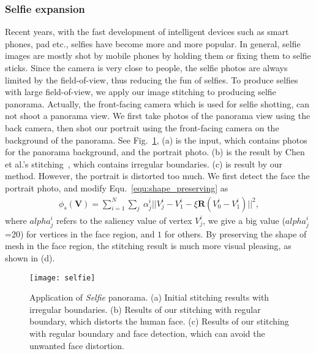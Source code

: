 \documentclass[10pt,journal,compsoc]{IEEEtran}
\begin{document}
 \subsubsection{Selfie expansion}

Recent years, with the fast development of intelligent devices such as smart phones, pad etc., selfies have become more and more popular.
In general, selfie images are mostly shot by mobile phones by holding them or fixing them to selfie sticks.
Since the camera is very close to people, the selfie photos are always limited by the field-of-view, thus reducing the fun of selfies.
To produce selfies with large field-of-view, we apply our image stitching to producing selfie panorama.
Actually, the front-facing camera which is used for selfie shotting, can not shoot a panorama view.
We first take photos of the panorama view using the back camera, then shot our portrait using the front-facing camera on the background of the panorama.
See Fig.~\ref{fig:selfie}, (a) is the input, which contains photos for the panorama background, and the portrait photo.
(b) is the result by Chen et al.'s stitching~\cite{conf/eccv/ChenC16}, which contains irregular boundaries.
(c) is result by our method. However, the portrait is distorted too much.
We first detect the face the portrait photo, and modify Equ.~\ref{equ:shape_preserving} as
\begin{equation} \label{equ:shape_preserving1}
\begin{split}
    \phi_s(\mathbf{V}) = \sum\limits_{i=1}^N\sum\limits_{j} \
    \alpha_j^i||V_j^i -V_1^i-\xi \mathbf{R}(V_0^i -V_1^i)||^2,
\end{split}
\end{equation}
where $alpha_j^i$ refers to the saliency value of vertex $V_j^i $, we give a big value ($alpha_j^i$=20) for vertices in the face region, and $1$ for others.
By preserving the shape of  mesh in the face region, the stitching result is much more visual pleasing, as shown in (d).

 \begin{figure} %
  \centering
  \texttt{[image: selfie]}
  \caption{Application of \emph{Selfie} panorama. (a) Initial stitching results with irregular boundaries. (b) Results of our stitching with regular boundary, which distorts the human face. (c) Results of our stitching with regular boundary and face detection, which can avoid the unwanted face distortion. } \label{fig:selfie}
\end{figure}
\end{document}

